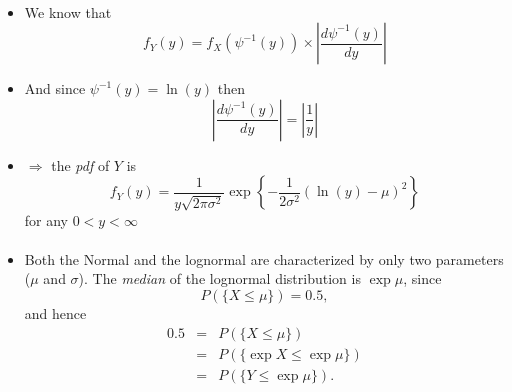 \documentclass[smaller]{beamer}\usepackage[]{graphicx}\usepackage[]{color}
\renewcommand{\Pr}{P}
\newenvironment{stepitemize}{\begin{itemize}[<+->]}{\end{itemize} }
\begin{document}
\begin{frame}{\secname}
  \framesubtitle{\subsecname}
  \begin{example}[continued]
  \begin{footnotesize}
  \begin{stepitemize}
  \item We know that
  \begin{equation*}
  f_{Y}\left( y\right) =f_{X}\left( \psi ^{-1}\left( y\right) \right) \times
  \left\vert \frac{d\psi ^{-1}\left( y\right) }{dy}\right\vert
  \end{equation*}

  \item And since $\psi ^{-1}\left( y\right) =\ln (y)$ then
  \begin{equation*}
  \left\vert \frac{d\psi ^{-1}\left( y\right) }{dy}\right\vert =\left\vert
  \frac{1}{y}\right\vert
  \end{equation*}

  \item $\Rightarrow $ the \emph{pdf} of $Y$ is
  \begin{equation*}
  f_{Y}\left( y\right) =\frac{1}{y\sqrt{2\pi \sigma ^{2}}}\exp{ \left\{ -\frac{1%
  }{2\sigma ^{2}}\left( \ln (y)-\mu \right) ^{2}\right\}}
  \end{equation*}
  for any $0<y<\infty $
  \end{stepitemize}
  \end{footnotesize}
  \end{example}
\end{frame}

\begin{frame}{\secname}
\framesubtitle{\subsecname}
  \begin{example}[continued]
  \begin{footnotesize}
  \begin{stepitemize}
  \item Both the Normal and the lognormal are characterized by
  only two parameters ($\mu$ and $\sigma$). The \emph{median} of the lognormal distribution is $\exp{
  \mu } $, since $$
  \Pr \left( \{ X\leq \mu \} \right) = 0.5,
  $$
  and hence%
  \begin{eqnarray*}
  0.5 &=&\Pr \left(\{ X\leq \mu \}\right) \\
  &=&\Pr \left( \{\exp{X} \leq \exp{ \mu }\} \right) \\
  &=&\Pr \left( \{Y\leq \exp{ \mu }\} \right).
  \end{eqnarray*}
  \end{stepitemize}
  \end{footnotesize}
  \end{example}
\end{frame}
\end{document}
